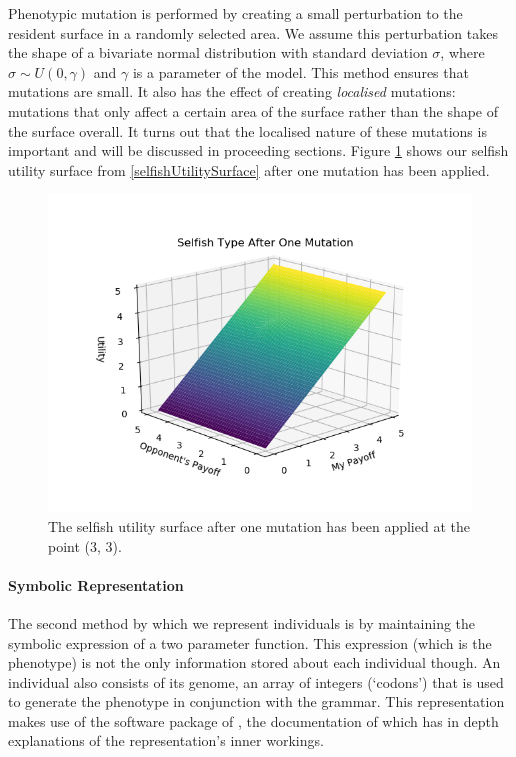 \documentclass[11pt]{book}
\newcommand*{\np}{\par\noindent\newline}
\begin{document}
\np Phenotypic mutation is performed by creating a small perturbation to the resident surface in a randomly selected area.
We assume this perturbation takes the shape of a bivariate normal distribution with standard deviation $\sigma$, where $\sigma \sim U(0,\gamma)$ and $\gamma$ is a parameter of the model.
This method ensures that mutations are small.
It also has the effect of creating \textit{localised} mutations: mutations that only affect a certain area of the surface rather than the shape of the surface overall.
It turns out that the localised nature of these mutations is important and will be discussed in proceeding sections.
Figure \ref{selfishUtilitySurfaceOneMutation} shows our selfish utility surface from \ref{selfishUtilitySurface} after one mutation has been applied.
\begin{figure}
	\centering
	\includegraphics[scale=0.7]{resources/one_mutation.png}
	\caption{The selfish utility surface after one mutation has been applied at the point (3, 3).}
	\label{selfishUtilitySurfaceOneMutation}
\end{figure}
\paragraph{Symbolic Representation}
\np The second method by which we represent individuals is by maintaining the symbolic expression of a two parameter function.
This expression (which is the phenotype) is not the only information stored about each individual though.
An individual also consists of its genome, an array of integers (`codons') that is used to generate the phenotype in conjunction with the grammar.
This representation makes use of the software package of \citet{fenton_ponyge2:_2017}, the documentation of which has in depth explanations of the representation's inner workings.
\end{document}
